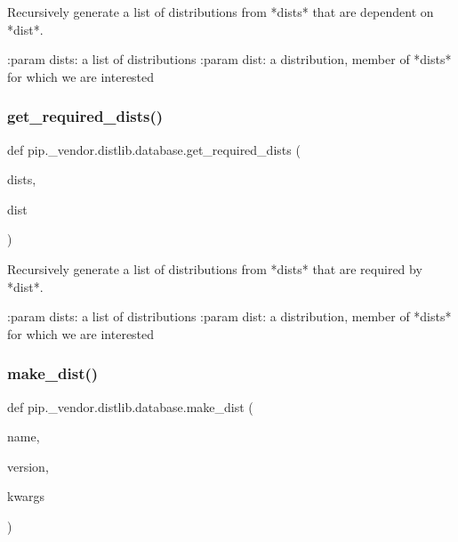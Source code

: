 \begin{DoxyVerb}Recursively generate a list of distributions from *dists* that are
dependent on *dist*.

:param dists: a list of distributions
:param dist: a distribution, member of *dists* for which we are interested
\end{DoxyVerb}
 \mbox{\label{namespacepip_1_1__vendor_1_1distlib_1_1database_a56612672fda608b5d09d6fe736c1270c}} 
\subsubsection{\texorpdfstring{get\+\_\+required\+\_\+dists()}{get\_required\_dists()}}
{\footnotesize\ttfamily def pip.\+\_\+vendor.\+distlib.\+database.\+get\+\_\+required\+\_\+dists (\begin{DoxyParamCaption}\item[{}]{dists,  }\item[{}]{dist }\end{DoxyParamCaption})}

\begin{DoxyVerb}Recursively generate a list of distributions from *dists* that are
required by *dist*.

:param dists: a list of distributions
:param dist: a distribution, member of *dists* for which we are interested
\end{DoxyVerb}
 \mbox{\label{namespacepip_1_1__vendor_1_1distlib_1_1database_ae4d947316c0bd48b1cf8de07d4bc5665}} 
\subsubsection{\texorpdfstring{make\+\_\+dist()}{make\_dist()}}
{\footnotesize\ttfamily def pip.\+\_\+vendor.\+distlib.\+database.\+make\+\_\+dist (\begin{DoxyParamCaption}\item[{}]{name,  }\item[{}]{version,  }\item[{}]{kwargs }\end{DoxyParamCaption})}

